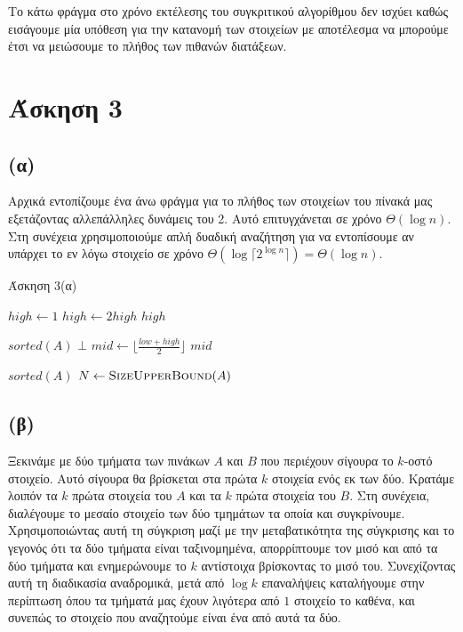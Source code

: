 \documentclass[11pt,a4paper]{book}
\begin{document}
Το κάτω φράγμα στο χρόνο εκτέλεσης του συγκριτικού αλγορίθμου δεν ισχύει καθώς εισάγουμε μία υπόθεση για την κατανομή των στοιχείων με αποτέλεσμα να μπορούμε έτσι να μειώσουμε το πλήθος των πιθανών διατάξεων.

\section*{Άσκηση 3}

\subsection*{(α)}
Αρχικά εντοπίζουμε ένα άνω φράγμα για το πλήθος των στοιχείων του πίνακά μας εξετάζοντας αλλεπάλληλες δυνάμεις του 2. Αυτό επιτυγχάνεται σε χρόνο $\Theta( \log n )$. Στη συνέχεια χρησιμοποιούμε απλή δυαδική αναζήτηση για να εντοπίσουμε αν υπάρχει το εν λόγω στοιχείο σε χρόνο $\Theta( \log \lceil 2^{\log n} \rceil ) = \Theta( \log n )$.

\begin{algorithm}[H]
\caption{\textgreek{Άσκηση 3(α)}}
\begin{algorithmic}[1]
    \State $high \gets 1$
        \State $high \gets 2high$
    \EndWhile
    \State \Return $high$
\EndProcedure

\Require $sorted(A)$
    	\State \Return $\bot$
    \EndIf
    \State $mid \gets \lfloor \frac{low + high}{2} \rfloor$
        \State \Return $mid$
    \EndIf
        \State \Return {}
    \EndIf
        \State \Return {}
	\EndIf
\EndProcedure

\Require $sorted(A)$
	\State $N \gets \Call{SizeUpperBound}{A}$
    \State \Return 
\EndProcedure
\end{algorithmic}
\end{algorithm}
    
\subsection*{(β)}
Ξεκινάμε με δύο τμήματα των πινάκων $A$ και $B$ που περιέχουν σίγουρα το $k$-οστό στοιχείο. Αυτό σίγουρα θα βρίσκεται στα πρώτα $k$ στοιχεία ενός εκ των δύο. Κρατάμε λοιπόν τα $k$ πρώτα στοιχεία του $A$ και τα $k$ πρώτα στοιχεία του $B$. Στη συνέχεια, διαλέγουμε το μεσαίο στοιχείο των δύο τμημάτων τα οποία και συγκρίνουμε. Χρησιμοποιώντας αυτή τη σύγκριση μαζί με την μεταβατικότητα της σύγκρισης και το γεγονός ότι τα δύο τμήματα είναι ταξινομημένα, απορρίπτουμε τον μισό και από τα δύο τμήματα και ενημερώνουμε το $k$ αντίστοιχα βρίσκοντας το μισό του. Συνεχίζοντας αυτή τη διαδικασία αναδρομικά, μετά από $\log k$ επαναλήψεις καταλήγουμε στην περίπτωση όπου τα τμήματά μας έχουν λιγότερα από $1$ στοιχείο το καθένα, και συνεπώς το στοιχείο που αναζητούμε είναι ένα από αυτά τα δύο.
\end{document}
